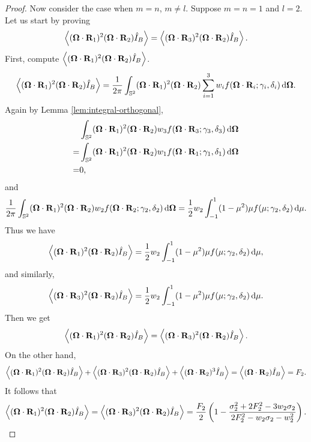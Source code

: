 \begin{proof}
Now consider the case when $m = n$, $m\not=l$. Suppose $m = n = 1$ and $l = 2$.
Let us start by proving
\[
  \Vint{ (\bOmega\cdot\bR_1)^2 (\bOmega\cdot\bR_2) \bansatz }=  
  \Vint{ (\bOmega\cdot\bR_3)^2 (\bOmega\cdot\bR_2) \bansatz }.
\]
First, compute $\Vint{ (\bOmega\cdot\bR_1)^2 (\bOmega\cdot\bR_2) \bansatz }$.
\[
  \Vint{ (\bOmega\cdot\bR_1)^2 (\bOmega\cdot\bR_2)
  \bansatz} = 
  \dfrac1{2\pi} \int_{\bbS^2} (\bOmega\cdot\bR_1)^2
  (\bOmega\cdot\bR_2)
  \sum_{i = 1}^3 w_i f(\bOmega\cdot\bR_i; 
  \gamma_i, \delta_i) \dd\bOmega.
\]
Again by Lemma \ref{lem:integral-orthogonal},
\[
  \begin{split}
    & \int_{\bbS^2} (\bOmega\cdot\bR_1)^2
    (\bOmega\cdot\bR_2)
    w_3 f(\bOmega\cdot\bR_3; \gamma_3, \delta_3)
    \dd\bOmega \\
    = & \int_{\bbS^2} (\bOmega\cdot\bR_1)^2  
      (\bOmega\cdot\bR_2) w_1 f(\bOmega\cdot\bR_1; \gamma_1, \delta_1)
      \dd\bOmega \\
    = & 0,
\end{split}
  \]
  and
  \[
    \dfrac1{2\pi} \int_{\bbS^2} (\bOmega\cdot\bR_1)^2
    (\bOmega\cdot\bR_2)
    w_2 f(\bOmega\cdot\bR_2; \gamma_2, \delta_2)
    \dd\bOmega =  \frac 12 w_2 \int_{-1}^1
    (1 - \mu^2) \mu f(\mu;\gamma_2,\delta_2) \dd\mu.
  \]
Thus we have
\[
  \Vint{ (\bOmega\cdot\bR_1)^2 (\bOmega\cdot\bR_2)
  \bansatz} = \frac 12 w_2 \int_{-1}^1
  (1 - \mu^2) \mu f(\mu;\gamma_2,\delta_2) \dd\mu,
\]
and similarly,
\[
  \Vint{ (\bOmega\cdot\bR_3)^2 (\bOmega\cdot\bR_2)
  \bansatz} = \frac 12 w_2 \int_{-1}^1
  (1 - \mu^2) \mu f(\mu;\gamma_2,\delta_2) \dd\mu.
\]
Then we get
\[
  \Vint{ (\bOmega\cdot\bR_1)^2 (\bOmega\cdot\bR_2) \bansatz }=  
  \Vint{ (\bOmega\cdot\bR_3)^2 (\bOmega\cdot\bR_2) \bansatz }.
\]
On the other hand,
\[
  \Vint{ (\bOmega\cdot\bR_1)^2 (\bOmega\cdot\bR_2) \bansatz } +  
  \Vint{ (\bOmega\cdot\bR_3)^2 (\bOmega\cdot\bR_2) \bansatz } + 
  \Vint{ (\bOmega\cdot\bR_2)^3 \bansatz } = 
  \Vint{ (\bOmega\cdot\bR_2) \bansatz } = F_2.
\]
It follows that
\[
  \Vint{ (\bOmega\cdot\bR_1)^2 (\bOmega\cdot\bR_2) \bansatz } =   
  \Vint{ (\bOmega\cdot\bR_3)^2 (\bOmega\cdot\bR_2) \bansatz } = 
  \dfrac{ F_2 }{2}\left(1-
    \dfrac{ \sigma_2^2 
    + 2 F_2^2 - 3 w_2 \sigma_2 }
    { 2 F_2^2 - w_2 \sigma_2 - w_2^2 }
  \right).
\]


\end{proof}
